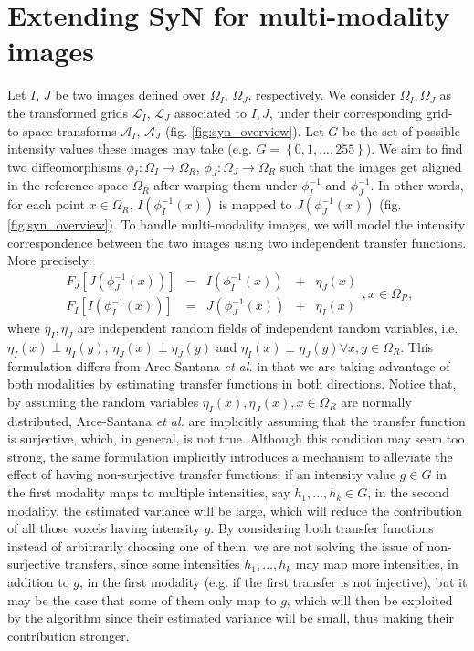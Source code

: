 \section{Extending SyN for multi-modality images}

Let $I$, $J$ be two images defined over $\Omega_{I}$, $\Omega_{J}$, respectively. We consider $\Omega_{I}, \Omega_{J}$ as the transformed grids $\mathcal{L}_{I}$, $\mathcal{L}_{J}$
associated to $I, J$, under their corresponding grid-to-space transforms $\mathcal{A}_{I}$, $\mathcal{A}_{J}$ (fig. \ref{fig:syn_overview}). Let $G$ be the set of possible intensity
values these images may take (e.g. $G=\left\lbrace 0,1,...,255\right\rbrace$). We aim to find two diffeomorphisms
$\phi_{I}:\Omega_{I}\rightarrow \Omega_{R}$, $\phi_{J}:\Omega_{J}\rightarrow \Omega_{R}$ such that the images get aligned in the reference space $\Omega_{R}$
after warping them under $\phi_{I}^{-1}$ and $\phi_{J}^{-1}$. In other words, for each point $x \in \Omega_{R}$, $I(\phi_{I}^{-1}(x))$ is mapped to $J(\phi_{J}^{-1}(x))$
(fig. \ref{fig:syn_overview}). To handle multi-modality images, we will model the intensity correspondence between the two images using two independent transfer functions.
More precisely:
\begin{equation}\label{eq:SyNEM_gom_ref}
    \begin{array}{ccccc}
        F_{J}[J(\phi_{J}^{-1}(x))] &=& I(\phi_{I}^{-1}(x)) &+& \eta_{J}(x)\\
        F_{I}[I(\phi_{I}^{-1}(x))] &=& J(\phi_{J}^{-1}(x)) &+& \eta_{I}(x)
    \end{array}, x\in\Omega_{R},
\end{equation}
where $\eta_{I}, \eta_{J}$ are independent random fields of independent random variables, i.e. $\eta_{I}(x) \perp \eta_{I}(y)$,
$\eta_{J}(x) \perp \eta_{J}(y)$ and $\eta_{I}(x) \perp \eta_{J}(y) \forall x,y\in \Omega_{R}$. This formulation differs from Arce-Santana {\it et al.} \cite{Arce-santana2014} in that
we are taking advantage of both modalities by estimating transfer functions in both directions. Notice that, by assuming the random variables
$\eta_{I}(x), \eta_{J}(x), x\in\Omega_{R}$ are normally distributed, Arce-Santana {\it et al.} \cite{Arce-santana2014} are implicitly assuming that the transfer function is surjective,
which, in general, is not true. Although this condition may seem too strong, the same formulation implicitly introduces a mechanism to alleviate the effect of having non-surjective
transfer functions: if an intensity value $g\in G$ in the first modality maps to multiple intensities, say $h_{1}, ..., h_{k}\in G$, in the second modality, the estimated variance
will be large, which will reduce the contribution of all those voxels having intensity $g$. By considering both transfer functions instead of arbitrarily choosing one of them, we
are not solving the issue of non-surjective transfers, since some intensities $h_{1}, ..., h_{k}$ may map more intensities, in addition to $g$, in the first modality (e.g. if the
first transfer is not injective), but it may be the case that some of them only map to $g$, which will then be exploited by the algorithm since their estimated variance will be small,
thus making their contribution stronger.\\

